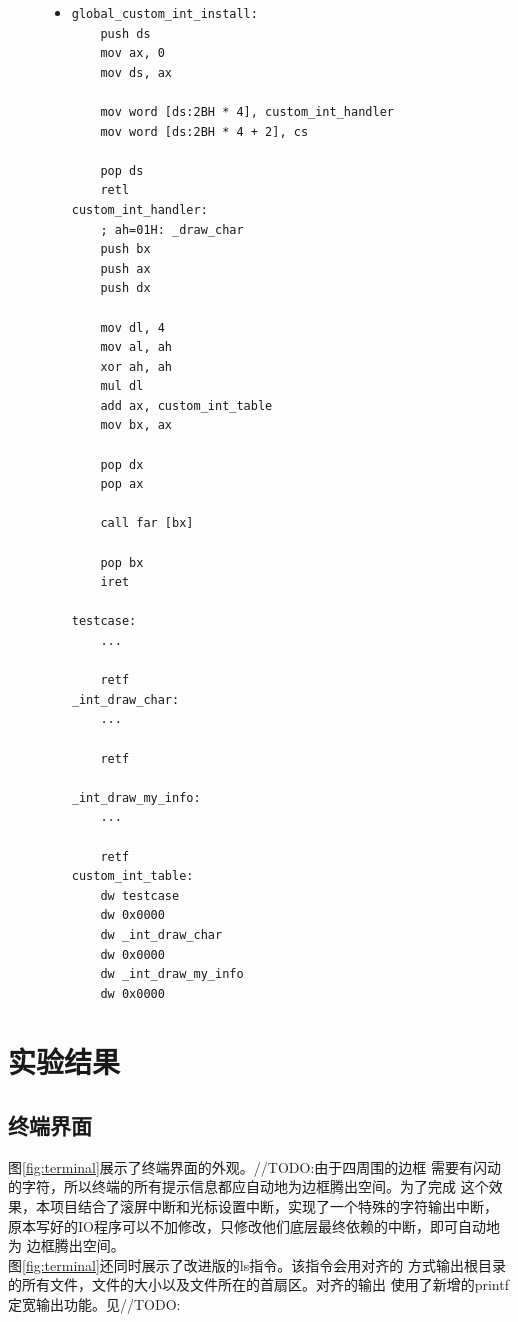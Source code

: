 \documentclass[a4paper]{article}
\begin{document}
    \begin{figure}[!h]
    \begin{itemize}
    \item[] \begin{lstlisting}[language={[x86masm]Assembler}, label=lst:custom_int, caption=用户自定义中断的实现]
global_custom_int_install:
    push ds
    mov ax, 0
    mov ds, ax

    mov word [ds:2BH * 4], custom_int_handler
    mov word [ds:2BH * 4 + 2], cs

    pop ds
    retl
custom_int_handler:
    ; ah=01H: _draw_char
    push bx
    push ax
    push dx 

    mov dl, 4
    mov al, ah
    xor ah, ah
    mul dl
    add ax, custom_int_table
    mov bx, ax

    pop dx
    pop ax

    call far [bx]

    pop bx
    iret

testcase:
    ...

    retf
_int_draw_char:
    ...

    retf

_int_draw_my_info:
    ...

    retf
custom_int_table:
    dw testcase
    dw 0x0000
    dw _int_draw_char
    dw 0x0000
    dw _int_draw_my_info
    dw 0x0000  
    \end{lstlisting}
    \end{itemize}
    \end{figure}
\section{实验结果}
\subsection{终端界面}
图\ref{fig:terminal}展示了终端界面的外观。//TODO:由于四周围的边框
需要有闪动的字符，所以终端的所有提示信息都应自动地为边框腾出空间。为了完成
这个效果，本项目结合了滚屏中断和光标设置中断，实现了一个特殊的字符输出中断，
原本写好的IO程序可以不加修改，只修改他们底层最终依赖的中断，即可自动地为
边框腾出空间。\\

图\ref{fig:terminal}还同时展示了改进版的ls指令。该指令会用对齐的
方式输出根目录的所有文件，文件的大小以及文件所在的首扇区。对齐的输出
使用了新增的printf定宽输出功能。见//TODO:\\
\end{document}
